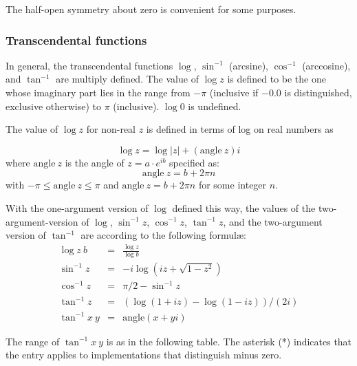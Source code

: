 \begin{rationale}
The half-open symmetry about zero is convenient for some purposes.
\end{rationale}

\subsubsection{Transcendental functions}
\label{transcendentalfunctions}

In general, the transcendental functions $\log$, $\sin^{-1}$
(arcsine), $\cos^{-1}$ (arccosine), and $\tan^{-1}$ are multiply
defined.  The value of $\log z$ is defined to be the one whose
imaginary part lies in the range from $-\pi$ (inclusive if $-0.0$ is
distinguished, exclusive otherwise) to $\pi$ (inclusive).  $\log 0$ is
undefined.

The value of $\log z$ for non-real $z$ is defined in terms of log on real numbers as 

\begin{displaymath}
\log z = \log |z| + (\mathrm{angle}~z)i
\end{displaymath}
%
where $\mathrm{angle}~z$ is the angle of $z = a\cdot e^{ib}$ specified
as:
$$\mathrm{angle}~z = b+2\pi n$$
with $-\pi \leq \mathrm{angle}~z\leq \pi$ and $\mathrm{angle}~z =
b+2\pi n$ for some integer $n$.

With the one-argument version of $\log$ defined this way, the values
of the two-argument-version of $\log$, $\sin^{-1} z$, $\cos^{-1} z$,
$\tan^{-1} z$, and the two-argument version of $\tan^{-1}$ are
according to the following formul\ae:
\begin{eqnarray*}
\log z~b &=& \frac{\log z}{\log b}\\
\sin^{-1} z &=& -i \log (i z + \sqrt{1 - z^2})\\
\cos^{-1} z &=& \pi / 2 - \sin^{-1} z\\
\tan^{-1} z &=& (\log (1 + i z) - \log (1 - i z)) / (2 i)\\
\tan^{-1} x~y &=& \mathrm{angle}(x+ yi)
\end{eqnarray*}

The range of $\tan^{-1} x~y$ is as in the following table. The
asterisk (*) indicates that the entry applies to implementations that
distinguish minus zero.

